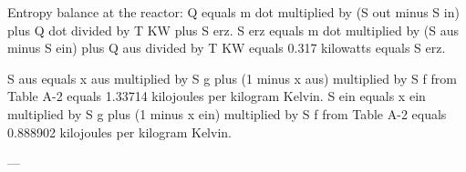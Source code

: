 Entropy balance at the reactor:  
Q equals m dot multiplied by (S out minus S in) plus Q dot divided by T KW plus S erz.  
S erz equals m dot multiplied by (S aus minus S ein) plus Q aus divided by T KW equals 0.317 kilowatts equals S erz.  

S aus equals x aus multiplied by S g plus (1 minus x aus) multiplied by S f from Table A-2 equals 1.33714 kilojoules per kilogram Kelvin.  
S ein equals x ein multiplied by S g plus (1 minus x ein) multiplied by S f from Table A-2 equals 0.888902 kilojoules per kilogram Kelvin.  

---